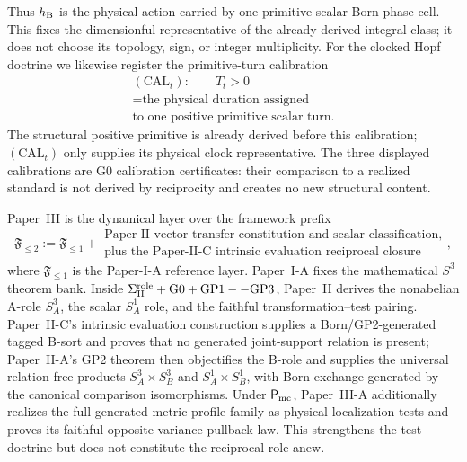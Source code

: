 \documentclass[12pt,a4paper]{article}
\begin{document}
Thus \(h_{\mathrm B}\) is the physical action carried by one primitive scalar Born
phase cell.  This fixes the dimensionful representative of the already derived
integral class; it does not choose its topology, sign, or integer multiplicity.  For
the clocked Hopf doctrine we likewise register the primitive-turn calibration
\[
 \begin{gathered}
 (\mathrm{CAL}_{t}):\qquad T_t>0\\
 =\text{the physical duration assigned}\\
 \text{to one positive primitive scalar turn}.
 \end{gathered}
\]
The structural positive primitive is already derived before this calibration;
$(\mathrm{CAL}_{t})$ only supplies its physical clock representative.  The
three displayed calibrations are G0 calibration certificates: their comparison
to a realized standard is not derived by reciprocity and creates no new
structural content.

Paper~III is the dynamical layer over the framework prefix
\[
        \mathfrak F_{\le2}
        :=
        \mathfrak F_{\le1}
        +
        \substack{\text{Paper-II vector-transfer constitution and scalar classification,}\\
        \text{plus the Paper-II-C intrinsic evaluation reciprocal closure}},
\]
where \(\mathfrak F_{\le1}\) is the Paper-I-A reference layer.  Paper~I-A fixes
the mathematical \(S^3\) theorem bank.  Inside
\(\Sigma_{\rm II}^{\rm role}+\mathrm{G0}+\mathrm{GP1--GP3}\), Paper~II derives the
nonabelian A-role \(S^3_A\), the scalar \(S^1_A\) role, and the faithful
transformation--test pairing.  Paper~II-C's intrinsic evaluation construction
supplies a Born/GP2-generated tagged B-sort and proves that no generated
joint-support relation is present; Paper~II-A's GP2 theorem then objectifies
the B-role and supplies the universal relation-free products
\(S^3_A\times S^3_B\) and \(S^1_A\times S^1_B\), with Born exchange generated
by the canonical comparison isomorphisms.  Under \(\mathsf P_{\rm mc}\),
Paper~III-A additionally realizes the full generated metric-profile family as
physical localization tests and proves its faithful opposite-variance
pullback law.  This strengthens the test doctrine but does not constitute the
reciprocal role anew.
\end{document}
